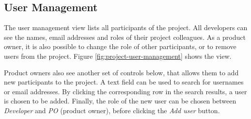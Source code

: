 \documentclass[
	accentcolor=tud1a %
]{tudreport}
\begin{document}
\subsection{User Management}
\label{sec:user-mgmt}

The user management view lists all participants of the project. All developers can see the names, email addresses and roles of their project colleagues. As a product owner, it is also possible to change the role of other participants, or to remove users from the project. Figure \ref{fig:project-user-management} shows the view.

Product owners also see another set of controls below, that allows them to add new participants to the project. A text field can be used to search for usernames or email addresses. By clicking the corresponding row in the search results, a user is chosen to be added. Finally, the role of the new user can be chosen between \emph{Developer} and \emph{PO} (product owner), before clicking the \emph{Add user} button.
\end{document}
